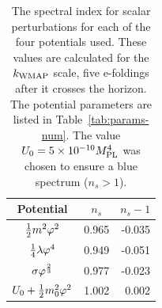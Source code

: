 \begin{table}
\begin{center}
\begin{tabular}{ccr}
\toprule
Potential & $n_s$ & $n_s - 1$ \\
\midrule
$\frac{1}{2} m^2 \varphi^2$ & 0.965 & -0.035 \\ 
$\frac{1}{4}\lambda\varphi^4$ & 0.949 & -0.051 \\
$\sigma\varphi^{\frac{2}{3}}$ & 0.977 & -0.023 \\
$U_0 + \frac{1}{2} m_0^2 \varphi^2$ & 1.002 & 0.002 \\
\bottomrule
\end{tabular}
\caption[Spectral index values for the four potentials]
{The spectral index for scalar perturbations for each of the four
potentials used. These values are calculated for the $k_\mathrm{WMAP}$ scale, five e-foldings
after it crosses the horizon. The potential parameters are listed in
Table~\ref{tab:params-num}. The value $U_0=5\times 10^{-10}M_{\mathrm{PL}}^{4}$ was chosen to ensure
a blue spectrum ($n_s>1$).
}
\label{table:ns-res}
\end{center}
\end{table}


